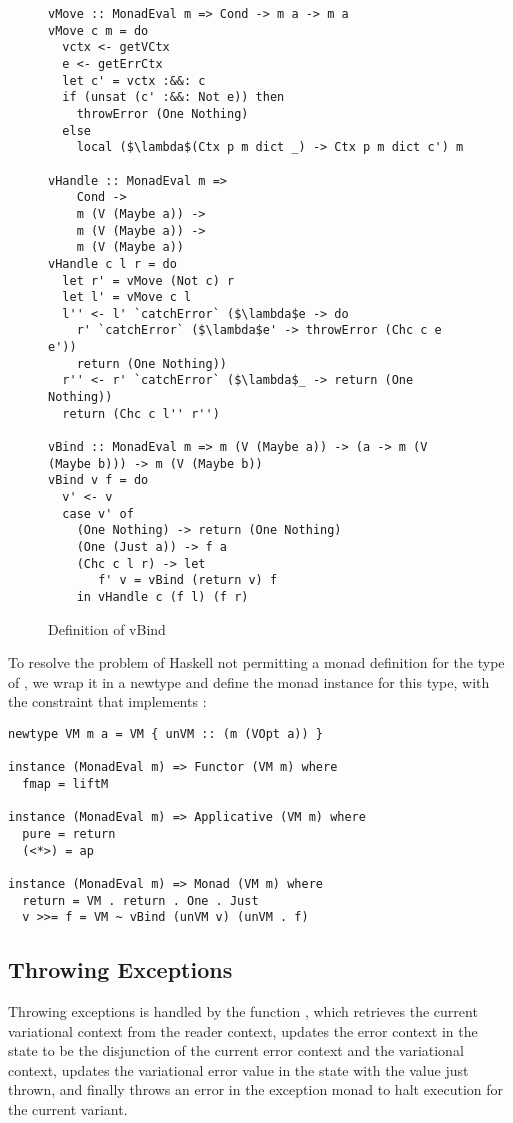 \documentclass[12pt,oneside]{book}
\begin{document}
\begin{figure}
\begin{lstlisting}
vMove :: MonadEval m => Cond -> m a -> m a
vMove c m = do
  vctx <- getVCtx
  e <- getErrCtx
  let c' = vctx :&&: c
  if (unsat (c' :&&: Not e)) then
    throwError (One Nothing)
  else
    local ($\lambda$(Ctx p m dict _) -> Ctx p m dict c') m

vHandle :: MonadEval m =>
    Cond -> 
    m (V (Maybe a)) -> 
    m (V (Maybe a)) -> 
    m (V (Maybe a))
vHandle c l r = do
  let r' = vMove (Not c) r
  let l' = vMove c l
  l'' <- l' `catchError` ($\lambda$e -> do
    r' `catchError` ($\lambda$e' -> throwError (Chc c e e'))
    return (One Nothing))
  r'' <- r' `catchError` ($\lambda$_ -> return (One Nothing))
  return (Chc c l'' r'')

vBind :: MonadEval m => m (V (Maybe a)) -> (a -> m (V (Maybe b))) -> m (V (Maybe b))
vBind v f = do
  v' <- v
  case v' of
    (One Nothing) -> return (One Nothing)
    (One (Just a)) -> f a
    (Chc c l r) -> let
       f' v = vBind (return v) f
    in vHandle c (f l) (f r)
\end{lstlisting}
\caption{Definition of vBind}
\label{fig:vbind}
\end{figure}

To resolve the problem of Haskell not permitting a monad definition for the type of , we wrap
it in a newtype  and define the monad instance for this type, with the constraint that  implements :

\begin{minipage}{\linewidth}
\begin{lstlisting}
newtype VM m a = VM { unVM :: (m (VOpt a)) }

instance (MonadEval m) => Functor (VM m) where
  fmap = liftM

instance (MonadEval m) => Applicative (VM m) where
  pure = return
  (<*>) = ap

instance (MonadEval m) => Monad (VM m) where
  return = VM . return . One . Just
  v >>= f = VM ~ vBind (unVM v) (unVM . f)
  \end{lstlisting}
\end{minipage}
  
\subsection{Throwing Exceptions}
\label{sec:throwing}

Throwing exceptions is handled by the function , which retrieves the current variational context
from the reader context, updates the error context in the state to be the disjunction of the current error context and the variational context,
updates the variational error value in the state with the  value just thrown, and finally throws an error in the exception monad to
halt execution for the current variant.
\end{document}
